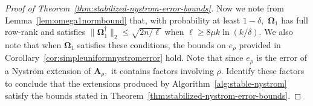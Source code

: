 \documentclass[11pt,letterpaper,twoside,reqno,nosumlimits]{amsart}
\def\pinv{\dagger}
\def\transp{T}
\newcommand{\mat}[1]{\ensuremath{\mathbf{#1}}}
\newcommand{\snorm}[1]{\ensuremath{\big\|#1\big\|_2}}
\theoremstyle{remark}
\newtheorem{remark}{Remark}
\begin{document}
\begin{proof}[Proof of Theorem~\ref{thm:stabilized-nystrom-error-bounds}]
Now we note from Lemma~\ref{lem:omega1normbound} that, with probability at least $1-\delta,$ $\mat{\Omega}_1$ has full row-rank and satisfies $\snorm{\mat{\Omega}_1^\pinv} \leq \sqrt{2n/\ell}$ when $\ell \geq 8\mu k \ln (k/\delta).$ We also note that when $\mat{\Omega}_1$ satisfies these conditions, the bounds on $e_\rho$ provided in  Corollary~\ref{cor:simpleuniformnystromerror} hold. Note that since $e_\rho$ is the error of a Nystr\"om extension of $\mat{A}_\rho,$ it contains factors involving $\rho.$ Identify these factors to conclude that the extensions produced by Algorithm~\ref{alg:stable-nystrom} satisfy the bounds stated in Theorem~\ref{thm:stabilized-nystrom-error-bounds}.
\end{proof}

%  
\end{document}
